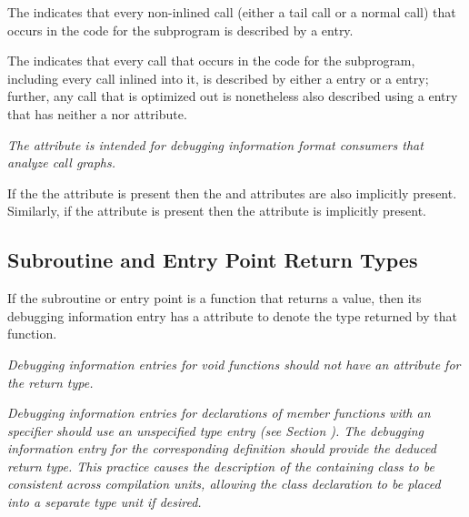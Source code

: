 The \DWATcallallcallsDEFN{}
indicates that every non-inlined call
(either a tail call or a normal call) that occurs in the code for the subprogram
is described by a \DWTAGcallsite{} entry.

The \DWATcallallsourcecallsDEFN{}
indicates that every call that occurs in the
code for the subprogram, including every call inlined into it, is described by either a 
\DWTAGcallsite{} entry or a \DWTAGinlinedsubroutine{} entry; further, any call
that is optimized out is nonetheless also described using a \DWTAGcallsite{} entry 
that has neither a \DWATcallpc{} nor \DWATcallreturnpc{} attribute.

\textit{The \DWATcallallsourcecallsNAME{} attribute is intended for debugging 
information format consumers that analyze call graphs.}

If the the \DWATcallallsourcecalls{} attribute is present then the 
\DWATcallallcalls{} and \DWATcallalltailcalls{} attributes are 
also implicitly present. Similarly, if the 
\DWATcallallcalls{} attribute is present then the \DWATcallalltailcalls{} 
attribute is implicitly present.

\subsection{Subroutine and Entry Point Return Types}
\label{chap:subroutineandentrypointreturntypes}

If\hypertarget{chap:DWATtypetypeofsubroutinereturn}{}
the subroutine or entry point 
is a function that returns a
value, then its debugging information entry has 
a \DWATtypeDEFN{} attribute 
to denote the type returned by that function.

\textit{Debugging information entries for 
 void functions should
not have an attribute for the return type.  }

\textit{Debugging information entries for declarations of  
member functions with an 
\autoreturntype{} specifier should use an unspecified type entry (see 
Section ). 
The debugging information entry for the corresponding definition
should provide the deduced return type.  This practice causes the description of
the containing class to be consistent across compilation units, allowing the class
declaration to be placed into a separate type unit if desired.}


